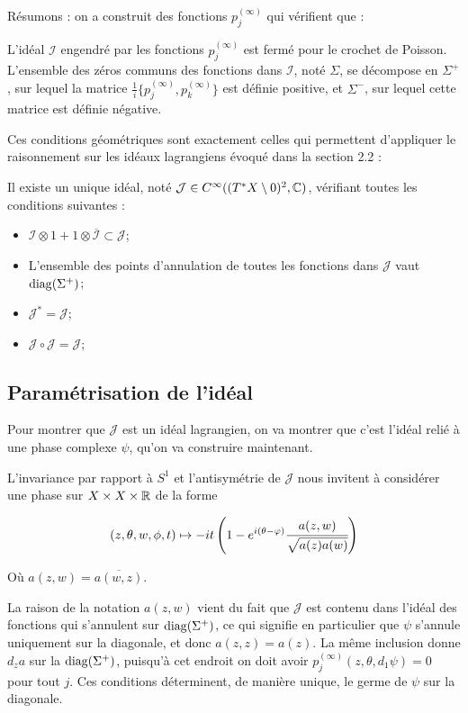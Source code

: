 Résumons : on a construit des fonctions $p^{(\infty)}_j$ qui vérifient que :
\begin{prop}
	L'idéal $\mathcal{I}$ engendré par les fonctions $p^{(\infty)}_j$ est fermé pour le crochet de Poisson. L'ensemble des zéros communs des fonctions dans $\mathcal{I}$, noté $\Sigma$, se décompose en $\Sigma^+$, sur lequel la matrice $\frac 1i \{p^{(\infty)}_j,p^{(\infty)}_k\}$ est définie positive, et $\Sigma^-$, sur lequel cette matrice est définie négative.
\end{prop}

Ces conditions géométriques sont exactement celles qui permettent
d'appliquer le raisonnement sur les idéaux lagrangiens évoqué dans la
section 2.2 :

\begin{prop}
	Il existe un unique idéal, noté $\mathcal{J} \in C^{\infty}((T^*X\setminus 0)^2,\mathbb{C})$, vérifiant toutes les conditions suivantes :
	\begin{itemize}
		\item $\mathcal{I}\otimes 1 + 1 \otimes \overline{\mathcal{I}}\subset\mathcal{J}$;
		\item L'ensemble des points d'annulation de toutes les fonctions dans $\mathcal{J}$ vaut $\operatorname{diag}(\Sigma^+)$;
		\item $\mathcal{J}^*=\mathcal{J}$;
		\item $\mathcal{J}\circ\mathcal{J}=\mathcal{J}$;
	\end{itemize}
\end{prop}

\subsection{Paramétrisation de l'idéal}
Pour montrer que $\mathcal{J}$ est un idéal lagrangien, on va montrer que c'est l'idéal relié à une phase complexe $\psi$, qu'on va construire maintenant.

L'invariance par rapport à $S^1$ et l'antisymétrie de $\mathcal{J}$ nous invitent à considérer une phase sur $X \times X \times \mathbb{R}$ de la forme

\begin{equation*}
	(z, \theta ,w, \phi ,t) \mapsto -it\left(1-e^{i(\theta-\varphi)}\cfrac{a(z,w)}{\sqrt{a(z)a(w)}}\right)
\end{equation*}

Où $a(z,w)=\overline{a(w,z)}$.

La raison de la notation $a(z,w)$ vient du fait que $\mathcal{J}$ est contenu dans l'idéal des fonctions qui s'annulent sur $\operatorname{diag}(\Sigma^+)$, ce qui signifie en particulier que $\psi$ s'annule uniquement sur la diagonale, et donc $a(z,z)=a(z)$. La même inclusion donne $d_za$ sur la $\operatorname{diag}(\Sigma^+)$, puisqu'à cet endroit on doit avoir $p^{(\infty)}_j(z,\theta,d_1\psi)=0$ pour tout $j$. Ces conditions déterminent, de manière unique, le germe de $\psi$ sur la diagonale. 


